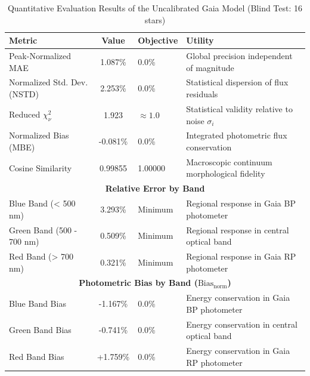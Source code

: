 
\begin{table}[htpb]
\centering
\caption{Quantitative Evaluation Results of the Uncalibrated Gaia Model (Blind Test: 16 stars)}
\label{tab:uncalibrated gaia_evaluation}
\begin{tabular}{lcll}
\hline
\textbf{Metric} & \textbf{Value} & \textbf{Objective} & \textbf{Utility} \\
\hline
Peak-Normalized MAE & 1.087\% & 0.0\% & Global precision independent of magnitude \\
Normalized Std. Dev. (NSTD) & 2.253\% & 0.0\% & Statistical dispersion of flux residuals \\
Reduced $\chi^2_\nu$ & 1.923 & $\approx 1.0$ & Statistical validity relative to noise $\sigma_i$ \\
Normalized Bias (MBE) & -0.081\% & 0.0\% & Integrated photometric flux conservation \\
Cosine Similarity & 0.99855 & 1.00000 & Macroscopic continuum morphological fidelity \\
\hline
\multicolumn{4}{c}{\textbf{Relative Error by Band}} \\
\hline
Blue Band (< 500 nm) & 3.293\% & Minimum & Regional response in Gaia BP photometer \\
Green Band (500 - 700 nm) & 0.509\% & Minimum & Regional response in central optical band \\
Red Band (> 700 nm) & 0.321\% & Minimum & Regional response in Gaia RP photometer \\
\hline
\multicolumn{4}{c}{\textbf{Photometric Bias by Band ($\text{Bias}_{\text{norm}}$)}} \\
\hline
Blue Band Bias & -1.167\% & 0.0\% & Energy conservation in Gaia BP photometer \\
Green Band Bias & -0.741\% & 0.0\% & Energy conservation in central optical band \\
Red Band Bias & +1.759\% & 0.0\% & Energy conservation in Gaia RP photometer \\
\hline
\end{tabular}
\end{table}
